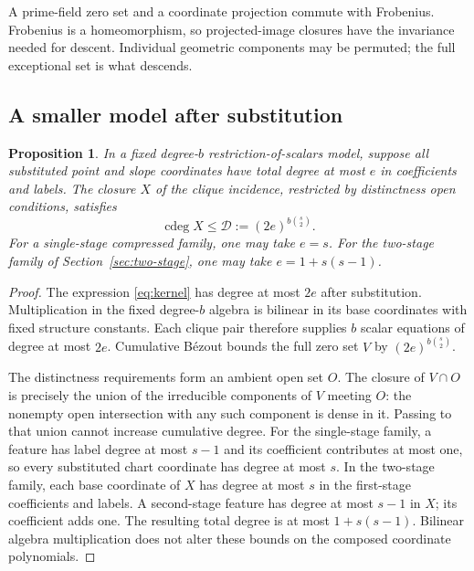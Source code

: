 \documentclass[11pt,a4paper]{article}
\DeclareMathOperator{\cdeg}{cdeg}
\newtheorem{proposition}[theorem]{Proposition}
\theoremstyle{definition}
\theoremstyle{remark}
\numberwithin{equation}{section}
\begin{document}
A prime-field zero set and a coordinate projection commute with Frobenius. Frobenius is a homeomorphism, so projected-image closures have the invariance needed for descent. Individual geometric components may be permuted; the full exceptional set is what descends.

\subsection{A smaller model after substitution}\label{sec:degree-model}
\begin{proposition}\label{prop:substituted-degree}
In a fixed degree-$b$ restriction-of-scalars model, suppose all substituted point and slope coordinates have total degree at most $e$ in coefficients and labels. The closure $X$ of the clique incidence, restricted by distinctness open conditions, satisfies
\begin{equation}\label{eq:substituted-degree}
\cdeg X\le\mathcal D:=(2e)^{b\binom s2}.
\end{equation}
For a single-stage compressed family, one may take $e=s$. For the two-stage family of Section~\ref{sec:two-stage}, one may take $e=1+s(s-1)$.
\end{proposition}

\begin{proof}
The expression \eqref{eq:kernel} has degree at most $2e$ after substitution. Multiplication in the fixed degree-$b$ algebra is bilinear in its base coordinates with fixed structure constants. Each clique pair therefore supplies $b$ scalar equations of degree at most $2e$. Cumulative B\'ezout bounds the full zero set $V$ by $(2e)^{b\binom s2}$.

The distinctness requirements form an ambient open set $O$. The closure of $V\cap O$ is precisely the union of the irreducible components of $V$ meeting $O$: the nonempty open intersection with any such component is dense in it. Passing to that union cannot increase cumulative degree.
For the single-stage family, a feature has label degree at most $s-1$ and its coefficient contributes at most one, so every substituted chart coordinate has degree at most $s$. In the two-stage family, each base coordinate of $X$ has degree at most $s$ in the first-stage coefficients and labels. A second-stage feature has degree at most $s-1$ in $X$; its coefficient adds one. The resulting total degree is at most $1+s(s-1)$. Bilinear algebra multiplication does not alter these bounds on the composed coordinate polynomials.
\end{proof}
\end{document}
